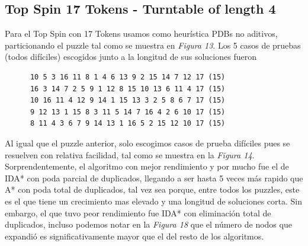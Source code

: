 \documentclass[a4paper,10pt]{article}
\begin{document}
    \newpage

  \subsection{Top Spin 17 Tokens - Turntable of length 4}
    Para el Top Spin con 17 Tokens usamos como heur\'istica PDBs no aditivos, 
    particionando el puzzle tal como se muestra en \textit{Figura 13}. Los 5 casos de pruebas (todos dif\'iciles) escogidos junto a la 
    longitud de sus soluciones fueron
    
    \begin{verbatim}
      10 5 3 16 11 8 1 4 6 13 9 2 15 14 7 12 17 (15)
      16 3 14 7 2 5 9 1 12 8 15 10 13 6 11 4 17 (15)
      10 16 11 4 12 9 14 1 15 13 3 2 5 8 6 7 17 (15)
      9 12 13 1 15 8 3 11 5 14 7 16 4 2 6 10 17 (15)
      8 11 4 3 6 7 9 14 13 1 16 5 2 15 12 10 17 (15)
    \end{verbatim}
    
    Al igual que el puzzle anterior, solo escogimos casos de prueba
    dif\'iciles pues se resuelven con relativa facilidad, tal como
    se muestra en la \textit{Figura 14}. Sorprendentemente, el 
    algoritmo con mejor rendimiento y por mucho fue el de IDA* con
    poda parcial de duplicados, llegando a ser hasta 5 veces
    m\'as rapido que A* con poda total de duplicados, tal vez sea
    porque, entre todos los puzzles, este es el que tiene un 
    crecimiento mas elevado y una longitud de soluciones corta.
    Sin embargo, el que tuvo peor rendimiento fue IDA* con 
    eliminaci\'on total de duplicados, incluso podemos notar en 
    la \textit{Figura 18} que el n\'umero de nodos que expandi\'o
    es significativamente mayor que el del resto de los algoritmos.
    
\end{document}
